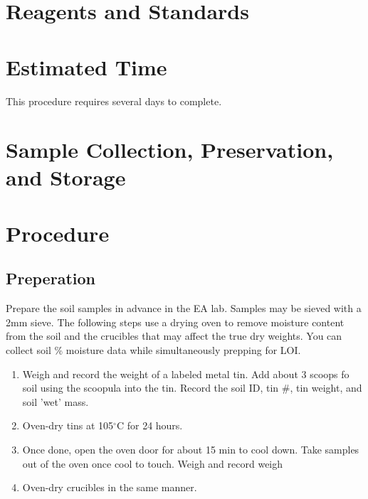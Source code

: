 \documentclass[12pt]{../SOP4_alpha}\usepackage[]{graphicx}\usepackage[]{xcolor}
\begin{document}
\section{Reagents and Standards}


\section{Estimated Time}

\NP This procedure requires several days to complete.


\section{Sample Collection, Preservation, and Storage}



\section{Procedure}

\subsection{Preperation}

\NP Prepare the soil samples in advance in the EA lab. Samples may be sieved with a 2mm sieve.
  The following steps use a drying oven to remove moisture content from the soil and the crucibles that may affect the true dry weights. You can collect soil \% moisture data while simultaneously prepping for LOI.
  
  \begin{enumerate}
	  \item Weigh and record the weight of a labeled metal tin. Add about 3 scoops fo soil using the scoopula into the tin. Record the soil ID, tin #, tin weight, and soil 'wet' mass.
	  \item Oven-dry tins at 105$^\circ$C for 24 hours.
	  \item Once done, open the oven door for about 15 min to cool down. Take samples out of the oven once cool to touch. Weigh and record weigh
	  \item Oven-dry crucibles in the same manner. %
	\end{enumerate}
	
\end{document}
